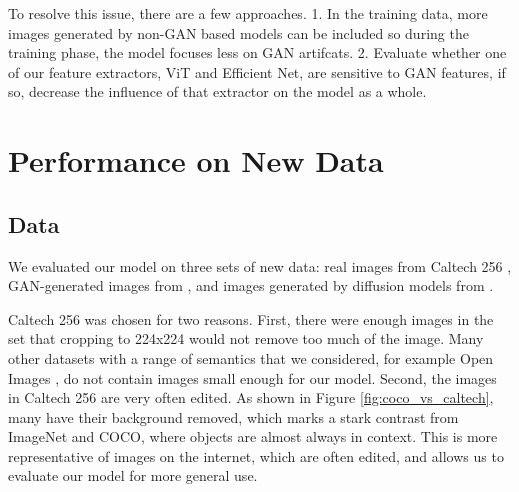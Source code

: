 \documentclass{article} %
\begin{document}
To resolve this issue, there are a few approaches. 1. In the training data, more images generated by non-GAN based models can be included so during the training phase, the model focuses less on GAN artifcats. 2. Evaluate whether one of our feature extractors, ViT and Efficient Net, are sensitive to GAN features, if so, decrease the influence of that extractor on the model as a whole.

\section{Performance on New Data}

\subsection{Data}

We evaluated our model on three sets of new data: real images from Caltech 256 \citep{griffinholubperona2022}, GAN-generated images from \citet{chuangchuangtanGANGenDetection}, and images generated by diffusion models from \citet{stable-diffusion-100k-custom-prompts-and-images}.

Caltech 256 was chosen for two reasons. First, there were enough images in the set that cropping to 224x224 would not remove too much of the image. Many other datasets with a range of semantics that we considered, for example Open Images \citep{Kuznetsova_2020}, do not contain images small enough for our model. Second, the images in Caltech 256 are very often edited. As shown in Figure \ref{fig:coco_vs_caltech}, many have their background removed, which marks a stark contrast from ImageNet and COCO, where objects are almost always in context. This is more representative of images on the internet, which are often edited, and allows us to evaluate our model for more general use.
\end{document}
